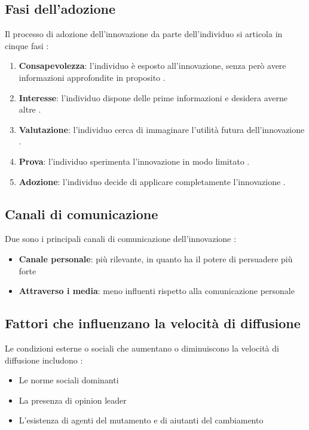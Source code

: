 \documentclass[12pt,a4paper]{article}
\begin{document}
\subsection{Fasi dell'adozione}
Il processo di adozione dell'innovazione da parte dell'individuo si articola in cinque fasi :

\begin{enumerate}
    \item \textbf{Consapevolezza}: l'individuo è esposto all'innovazione, senza però avere informazioni approfondite in proposito .
    \item \textbf{Interesse}: l'individuo dispone delle prime informazioni e desidera averne altre .
    \item \textbf{Valutazione}: l'individuo cerca di immaginare l'utilità futura dell'innovazione .
    \item \textbf{Prova}: l'individuo sperimenta l'innovazione in modo limitato .
    \item \textbf{Adozione}: l'individuo decide di applicare completamente l'innovazione .
\end{enumerate}

\subsection{Canali di comunicazione}
Due sono i principali canali di comunicazione dell'innovazione :
\begin{itemize}
    \item \textbf{Canale personale}: più rilevante, in quanto ha il potere di persuadere più forte
    \item \textbf{Attraverso i media}: meno influenti rispetto alla comunicazione personale
\end{itemize}

\subsection{Fattori che influenzano la velocità di diffusione}
Le condizioni esterne o sociali che aumentano o diminuiscono la velocità di diffusione includono :
\begin{itemize}
    \item Le norme sociali dominanti
    \item La presenza di opinion leader
    \item L'esistenza di agenti del mutamento e di aiutanti del cambiamento
\end{itemize}
\end{document}
